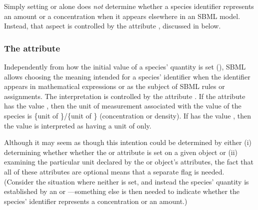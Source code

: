 Simply setting  or
 alone does \emph{not} determine
whether a species identifier represents an amount or a
concentration when it appears elsewhere in an SBML model.
Instead, that aspect is controlled by the attribute
, discussed in
 below.


\subsubsection{The  attribute}
\label{sec:species-units}

Independently from how the initial value of a species' quantity is
set (), SBML allows
choosing the meaning intended for a species' identifier when the
identifier appears in mathematical expressions or as the subject
of SBML rules or assignments.  The interpretation is controlled by
the attribute .  If the attribute has
the value , then the unit of measurement associated
with the value of the species is \{unit of
\}/\{unit of \} (\ie concentration
or density).  If  has the value
, then the value is interpreted as having a unit of
 only.

Although it may seem as though this intention could be determined
by either (i) determining whether whether the
 or  attribute is
set on a given \Species object or (ii) examining the particular
unit declared by the \Species or \Model object's
 attributes, the fact that all of these
attributes are optional means that a separate flag is needed.
(Consider the situation where neither is set, and instead the
species' quantity is established by an \InitialAssignment or
\AssignmentRule---something else is then needed to indicate
whether the species' identifier represents a concentration or an
amount.)

